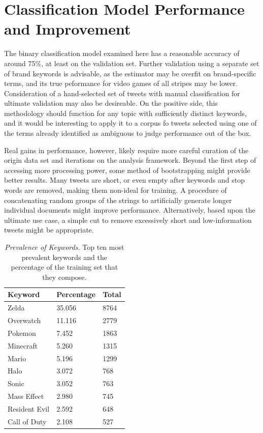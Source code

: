 \documentclass[11pt]{revtex4-1}
\begin{document}
\section{Classification Model Performance and Improvement}
\label{sec:analysis}

The binary classification model examined here has a reasonable
accuracy of around 75\%, at least on the validation set.  Further
validation using a separate set of brand keywords is advisable, as the
estimator may be overfit on brand-specific terms, and its true
peformance for video games of all stripes may be lower.  Consideration
of a hand-selected set of tweets with manual classification for
ultimate validation may also be desireable.  On the positive side,
this methodology should function for any topic with sufficiently
distinct keywords, and it would be interesting to apply it to a corpus
fo tweets selected using one of the terms already identified as
ambiguous to judge performance out of the box.

Real gains in performance, however, likely require more careful
curation of the origin data set and iterations on the analysis
framework.  Beyond the first step of accessing more processing power,
some method of bootstrapping might provide better results.  Many
tweets are short, or even empty after keywords and stop words are
removed, making them non-ideal for training.  A procedure of
concatenating random groups of the strings to artificially generate
longer individual documents might improve performance.  Alternatively,
based upon the ultimate use case, a simple cut to remove excessively
short and low-information tweets might be appropriate.

\begin{table}
  \begin{tabular}{|l|l|l|}
    \hline
    Keyword & Percentage & Total \\
    \hline
    Zelda & 35.056 & 8764 \\
    Overwatch & 11.116 & 2779 \\
    Pokemon & 7.452 & 1863 \\
    Minecraft & 5.260 & 1315 \\
    Mario & 5.196 & 1299 \\
    Halo & 3.072 & 768 \\
    Sonic & 3.052 & 763 \\
    Mass Effect & 2.980 & 745 \\
    Resident Evil & 2.592 & 648 \\
    Call of Duty & 2.108 & 527 \\
    \hline
  \end{tabular}
  \caption{\emph{Prevalence of Keywords.}  Top ten most prevalent
    keywords and the percentage of the training set that they
    compose.}
  \label{table:prevalence}
\end{table}
\end{document}
